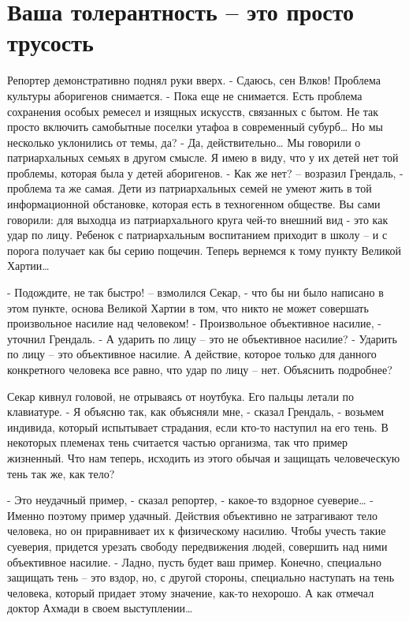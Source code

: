 \documentclass[10pt,final]{book}
\begin{document}
\chapter{Ваша толерантность -- это просто трусость}


Репортер демонстративно поднял руки вверх.
- Сдаюсь, сен Влков! Проблема культуры аборигенов снимается.
- Пока еще не снимается. Есть проблема сохранения особых ремесел и изящных искусств, связанных с бытом. Не так просто включить самобытные поселки утафоа в современный субурб\ldots{} Но мы несколько уклонились от темы, да?
- Да, действительно\ldots{} Мы говорили о патриархальных семьях в другом смысле. Я имею в виду, что у их детей нет той проблемы, которая была у детей аборигенов.
- Как же нет? -- возразил Грендаль, - проблема та же самая. Дети из патриархальных семей не умеют жить в той информационной обстановке, которая есть в техногенном обществе. Вы сами говорили: для выходца из патриархального круга чей-то внешний вид - это как удар по лицу. Ребенок с патриархальным воспитанием приходит в школу -- и с порога получает как бы серию пощечин. Теперь вернемся к тому пункту Великой Хартии\ldots{}

- Подождите, не так быстро! -- взмолился Секар, - что бы ни было написано в этом пункте, основа Великой Хартии в том, что никто не может совершать произвольное насилие над человеком!
- Произвольное объективное насилие, - уточнил Грендаль.
- А ударить по лицу -- это не объективное насилие?
- Ударить по лицу -- это объективное насилие. А действие, которое только для данного конкретного человека все равно, что удар по лицу -- нет. Объяснить подробнее?

Секар кивнул головой, не отрываясь от ноутбука. Его пальцы летали по клавиатуре.
- Я объясню так, как объясняли мне, - сказал Грендаль, - возьмем индивида, который испытывает страдания, если кто-то наступил на его тень. В некоторых племенах тень считается частью организма, так что пример жизненный. Что нам теперь, исходить из этого обычая и защищать человеческую тень так же, как тело?

- Это неудачный пример, - сказал репортер, - какое-то вздорное суеверие\ldots{}
- Именно поэтому пример удачный. Действия объективно не затрагивают тело человека, но он приравнивает их к физическому насилию. Чтобы учесть такие суеверия, придется урезать свободу передвижения людей, совершить над ними объективное насилие.
- Ладно, пусть будет ваш пример. Конечно, специально защищать тень -- это вздор, но, с другой стороны, специально наступать на тень человека, который придает этому значение, как-то нехорошо. А как отмечал доктор Ахмади в своем выступлении\ldots{}
\end{document}
